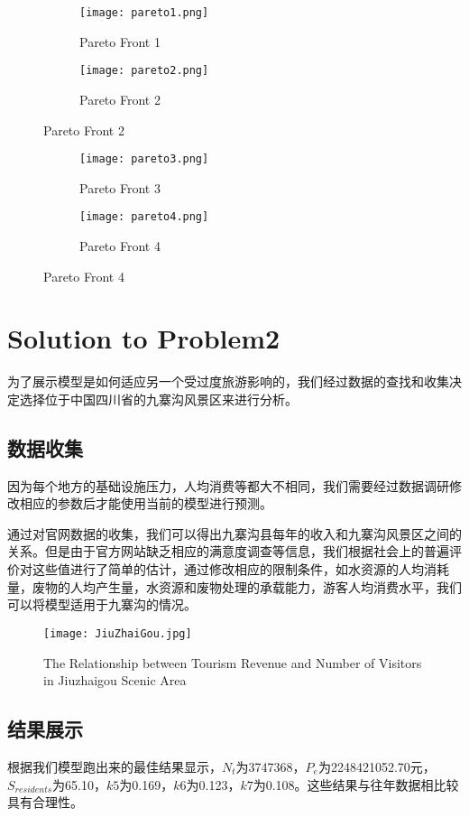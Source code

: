 \documentclass[12pt]{article}  %
\begin{document}
\begin{figure}[htbp]
\centering
\begin{subfigure}[b]{.4\textwidth}
\texttt{[image: pareto1.png]}
\caption{Pareto Front 1}\label{subfig:left1}
\end{subfigure}
\begin{subfigure}[b]{.4\textwidth}
	\texttt{[image: pareto2.png]}
	\caption{Pareto Front 2}\label{subfig:right1}
\end{subfigure}
\end{figure}

\begin{figure}[htbp]
	\centering
	\begin{subfigure}[b]{.4\textwidth}
		\texttt{[image: pareto3.png]}
		\caption{Pareto Front 3}\label{subfig:left2}
	\end{subfigure}
	\begin{subfigure}[b]{.4\textwidth}
		\texttt{[image: pareto4.png]}
		\caption{Pareto Front 4}\label{subfig:right2}
	\end{subfigure}
\end{figure}

\section{Solution to Problem2}
为了展示模型是如何适应另一个受过度旅游影响的，我们经过数据的查找和收集决定选择位于中国四川省的九寨沟风景区来进行分析。
\subsection{数据收集}
因为每个地方的基础设施压力，人均消费等都大不相同，我们需要经过数据调研修改相应的参数后才能使用当前的模型进行预测。

通过对官网数据的收集\cite{8}，我们可以得出九寨沟县每年的收入和九寨沟风景区之间的关系。但是由于官方网站缺乏相应的满意度调查等信息，我们根据社会上的普遍评价对这些值进行了简单的估计，通过修改相应的限制条件，如水资源的人均消耗量，废物的人均产生量，水资源和废物处理的承载能力，游客人均消费水平，我们可以将模型适用于九寨沟的情况。
\begin{figure}[H]
	\centering
	\texttt{[image: JiuZhaiGou.jpg]}
	\caption{The Relationship between Tourism Revenue and Number of Visitors in Jiuzhaigou Scenic Area}\label{fig:JiuZhaiGou}
\end{figure}
\subsection{结果展示}
根据我们模型跑出来的最佳结果显示，$N_t$为3747368，$P_e$为2248421052.70元，$S_{residents}$为65.10，$k5$为0.169，$k6$为0.123，$k7$为0.108。这些结果与往年数据相比较具有合理性。
\end{document}
